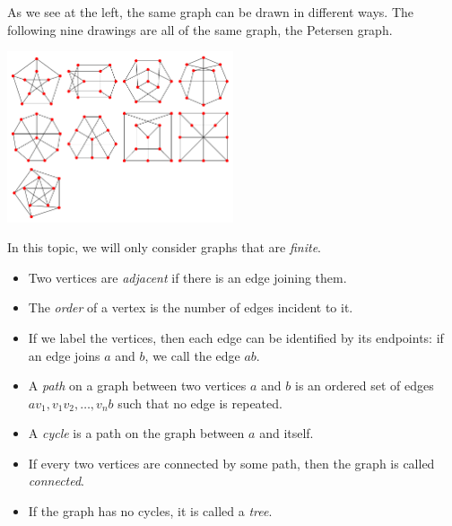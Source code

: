 
As we see at the left, the same graph can be drawn in different ways. The following nine drawings are all of the same graph, the
Petersen graph.

\begin{center}
  \includegraphics[width=0.5\textwidth]{petersen}
\end{center}

In this topic, we will only consider graphs that are \emph{finite}.

\begin{defn}\leavevmode
  \begin{itemize}
    \item Two vertices are \emph{adjacent} if there is an edge joining them.
    \item The \emph{order} of a vertex is the number of edges incident to it.
    \item If we label the vertices, then each edge can be identified by its endpoints: if an edge joins $ a $ and $ b $, we call the edge $ ab $.
    \item A \emph{path} on a graph between two vertices $ a $ and $ b $ is an ordered set of edges $ av_1, v_1 v_2, \dots, v_n b $ such
          that no edge is repeated.
    \item A \emph{cycle} is a path on the graph between $ a $ and itself.
    \item If every two vertices are connected by some path, then the graph is called \emph{connected}.
    \item If the graph has no cycles, it is called a \emph{tree}.
  \end{itemize}
\end{defn}

